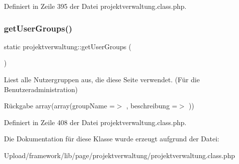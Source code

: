 Definiert in Zeile 395 der Datei projektverwaltung.\+class.\+php.

\mbox{\label{classprojektverwaltung_a387d5e401120846f7040013ab7d7dc89}} 
\subsubsection{\texorpdfstring{get\+User\+Groups()}{getUserGroups()}}
{\footnotesize\ttfamily static projektverwaltung\+::get\+User\+Groups (\begin{DoxyParamCaption}{ }\end{DoxyParamCaption})\hspace{0.3cm}{\ttfamily [static]}}

Liest alle Nutzergruppen aus, die diese Seite verwendet. (Für die Benutzeradministration) \begin{DoxyReturn}{Rückgabe}
array(array(\textquotesingle{}group\+Name\textquotesingle{} =$>$ \textquotesingle{}\textquotesingle{}, \textquotesingle{}beschreibung\textquotesingle{} =$>$ \textquotesingle{}\textquotesingle{})) 
\end{DoxyReturn}


Definiert in Zeile 408 der Datei projektverwaltung.\+class.\+php.



Die Dokumentation für diese Klasse wurde erzeugt aufgrund der Datei\+:\begin{DoxyCompactItemize}
\item 
Upload/framework/lib/page/projektverwaltung/projektverwaltung.\+class.\+php\end{DoxyCompactItemize}
